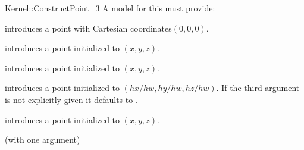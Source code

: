 \begin{ccRefFunctionObjectConcept}{Kernel::ConstructPoint_3}
A model for this must provide:


            {introduces a point with Cartesian coordinates$(0,0,0)$.}

\ccHidden{}
            {introduces a point  initialized to $(x,y,z)$.}

\ccHidden{}
            {introduces a point  initialized to $(x,y,z)$.}

\ccHidden{}
            {introduces a point  initialized to $(hx/hw,hy/hw, hz/hw)$.
             If the third argument is not explicitly given it defaults
             to .
              }

\ccHidden{}
            {introduces a point  initialized to $(x,y,z)$.}

\ccRefines
{} (with one argument)

\ccSeeAlso
{} \\

\end{ccRefFunctionObjectConcept}

